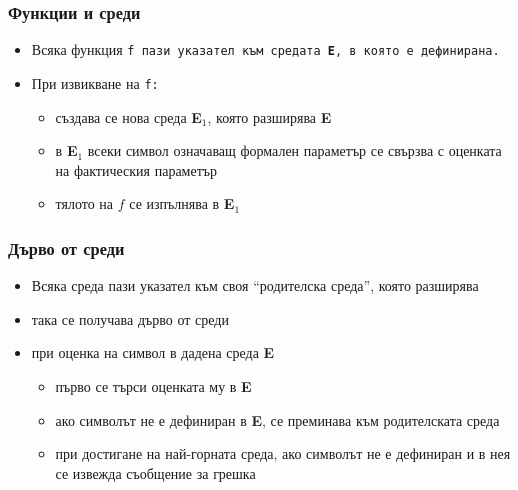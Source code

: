\documentclass{beamer}
\begin{document}
\begin{frame}
  \frametitle{Функции и среди}

  \begin{itemize}[<+->]
  \item Всяка функция \tt f пази указател към средата \textbf E, в която е дефинирана.
  \item При извикване на \tt f:
    \begin{itemize}
    \item създава се нова среда \textbf{E$_1$}, която разширява \textbf{E}
    \item в \textbf{E$_1$} всеки символ означаващ формален параметър се свързва с оценката на фактическия параметър
    \item тялото на $f$ се изпълнява в \textbf{E$_1$}
    \end{itemize}
  \end{itemize}
\end{frame}

\begin{frame}
  \frametitle{Дърво от среди}
  \begin{itemize}[<+->]
  \item Всяка среда пази указател към своя ``родителска среда'', която разширява
  \item така се получава дърво от среди
  \item при оценка на символ в дадена среда \textbf E
    \begin{itemize}
    \item първо се търси оценката му в \textbf E
    \item ако символът не е дефиниран в \textbf E, се преминава към родителската среда
    \item при достигане на най-горната среда, ако символът не е дефиниран и в нея се извежда съобщение за грешка
    \end{itemize}
  \end{itemize}
\end{frame}
\end{document}

